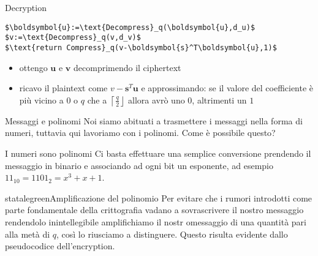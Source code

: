 \begin{frame}[fragile]{Decryption}

    \vspace{\baselineskip}

    \begin{minipage}{0.35\linewidth}
        \begin{lstlisting}[title=Kyber.CPA.Dec(sk\,c):,mathescape=true]
$\boldsymbol{u}:=\text{Decompress}_q(\boldsymbol{u},d_u)$
$v:=\text{Decompress}_q(v,d_v)$
$\text{return Compress}_q(v-\boldsymbol{s}^T\boldsymbol{u},1)$
        \end{lstlisting}
    \end{minipage}\hfill
    \begin{minipage}{0.6\linewidth}
        \begin{itemize}%
            \item ottengo $\boldsymbol{u}$ e $\boldsymbol{v}$ decomprimendo il ciphertext
            \item ricavo il plaintext come $v-\boldsymbol{s}^T\boldsymbol{u}$ e approssimando: se il valore del coefficiente è più vicino a $0$ o $q$ che a $\left\lceil\frac{q}{2}\right\rfloor$ allora avrò uno $0$, altrimenti un $1$
        \end{itemize}
    \end{minipage}

\end{frame}

\begin{frame}{Messaggi e polinomi}
    Noi siamo abituati a trasmettere i messaggi nella forma di numeri, tuttavia qui lavoriamo con i polinomi. Come è possibile questo?

    \begin{block}{I numeri sono polinomi}
        Ci basta effettuare una semplice conversione prendendo il messaggio in binario e associando ad ogni bit un esponente, ad esempio $11_{10}=1101_2=x^3+x+1$.
    \end{block}

    \begin{colorblock}{statalegreen}{Amplificazione del polinomio}
        Per evitare che i rumori introdotti come parte fondamentale della crittografia vadano a sovrascrivere il nostro messaggio rendendolo inintellegibile amplifichiamo il nostr omessaggio di una quantità pari alla metà di $q$, così lo riusciamo a distinguere. Questo risulta evidente dallo pseudocodice dell'encryption.
    \end{colorblock}
\end{frame}

